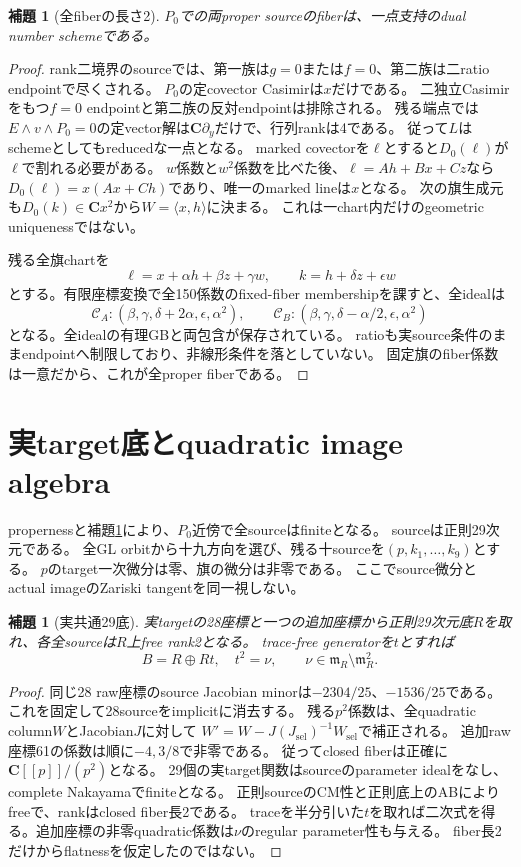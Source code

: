 \documentclass[11pt,a4paper]{ltjsarticle}
\newcommand{\CC}{\mathbf C}
\newcommand{\CA}{\mathcal C_A}
\newcommand{\CB}{\mathcal C_B}
\newtheorem{lemma}[theorem]{補題}
\theoremstyle{definition}
\theoremstyle{remark}
\begin{document}
\begin{lemma}[全fiberの長さ2]\label{lem:fiber2}
$P_0$での両proper sourceのfiberは、一点支持のdual number schemeである。
\end{lemma}
\begin{proof}
rank二境界のsourceでは、第一族は$g=0$または$f=0$、第二族は二ratio endpointで尽くされる。
$P_0$の定covector Casimirは$x$だけである。
二独立Casimirをもつ$f=0$ endpointと第二族の反対endpointは排除される。
残る端点では$E\wedge v\wedge P_0=0$の定vector解は$\CC\partial_y$だけで、行列rankは4である。
従って$L$はschemeとしてもreducedな一点となる。
marked covectorを$\ell$とすると$D_0(\ell)$が$\ell$で割れる必要がある。
$w$係数と$w^2$係数を比べた後、$\ell=Ah+Bx+Cz$なら
$D_0(\ell)=x(Ax+Ch)$であり、唯一のmarked lineは$x$となる。
次の旗生成元も$D_0(k)\in\CC x^2$から$W=\langle x,h\rangle$に決まる。
これは一chart内だけのgeometric uniquenessではない。

残る全旗chartを
\[
 \ell=x+\alpha h+\beta z+\gamma w,\qquad k=h+\delta z+\epsilon w
\]
とする。有限座標変換で全150係数のfixed-fiber membershipを課すと、全idealは
\[
 \CA:(\beta,\gamma,\delta+2\alpha,\epsilon,\alpha^2),\qquad
 \CB:(\beta,\gamma,\delta-\alpha/2,\epsilon,\alpha^2)
\]
となる。全idealの有理GBと両包含が保存されている。
ratioも実source条件のままendpointへ制限しており、非線形条件を落としていない。
固定旗のfiber係数は一意だから、これが全proper fiberである。
\end{proof}

\section{実target底とquadratic image algebra}

propernessと補題\ref{lem:fiber2}により、$P_0$近傍で全sourceはfiniteとなる。
sourceは正則29次元である。
全GL orbitから十九方向を選び、残る十sourceを$(p,k_1,\ldots,k_9)$とする。
$p$のtarget一次微分は零、旗の微分は非零である。
ここでsource微分とactual imageのZariski tangentを同一視しない。

\begin{lemma}[実共通29底]\label{lem:base}
実targetの28座標と一つの追加座標から正則29次元底$R$を取れ、各全sourceは$R$上free rank2となる。
trace-free generatorを$t$とすれば
\[
 B=R\oplus Rt,\quad t^2=\nu,
 \qquad \nu\in\mathfrak m_R\setminus\mathfrak m_R^2.
\]
\end{lemma}
\begin{proof}
同じ28 raw座標のsource Jacobian minorは$-2304/25$、$-1536/25$である。
これを固定して28sourceをimplicitに消去する。
残る$p^2$係数は、全quadratic column$W$とJacobian$J$に対して
$W'=W-J(J_{\mathrm{sel}})^{-1}W_{\mathrm{sel}}$で補正される。
追加raw座標61の係数は順に$-4,3/8$で非零である。
従ってclosed fiberは正確に$\CC[[p]]/(p^2)$となる。
29個の実target関数はsourceのparameter idealをなし、complete Nakayamaでfiniteとなる。
正則sourceのCM性と正則底上のABによりfreeで、rankはclosed fiber長2である。
traceを半分引いた$t$を取れば二次式を得る。追加座標の非零quadratic係数は$\nu$のregular parameter性も与える。
fiber長2だけからflatnessを仮定したのではない。
\end{proof}
\end{document}
